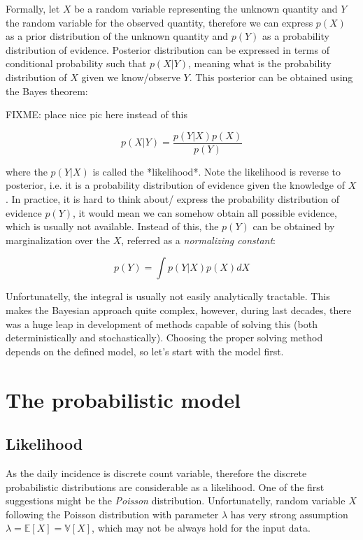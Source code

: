 \documentclass[
  digital, %
  oneside, %
  lof,     %
  lot,     %
]{fithesis4}
\begin{document}
Formally, let $X$ be a random variable representing 
the unknown quantity and $Y$ the random variable for 
the observed quantity, therefore we can express $p(X)$ 
as a prior distribution of the unknown quantity and 
$p(Y)$ as a probability distribution of evidence. 
Posterior distribution can be expressed in terms of 
conditional probability such that $p(X | Y)$, meaning 
what is the probability distribution of $X$ given we 
know/observe $Y$. 
This posterior can be obtained using the Bayes 
theorem:

FIXME: place nice pic here instead of this

\begin{equation}
p( X | Y ) = \frac{p( Y | X ) p(X)}{p(Y)}
\end{equation}

where the $p( Y | X )$ is called the *likelihood*. 
Note the likelihood is reverse to posterior, i.e. it 
is a probability distribution of evidence given the 
knowledge of $X$. 
In practice, it is hard to think about/ express the 
probability distribution of evidence $p(Y)$, it would 
mean we can somehow obtain all possible evidence, which 
is usually not available. 
Instead of this, the $p(Y)$ can be obtained by 
marginalization over the $X$, referred as a 
\textit{normalizing constant}:

\begin{equation}
p(Y) = \int p( Y | X ) p(X) dX
\end{equation}

Unfortunatelly, the integral is usually not easily 
analytically tractable. 
This makes the Bayesian approach quite complex, 
however, during last decades, there was a huge leap 
in development of methods capable of solving this 
(both deterministically and stochastically). 
Choosing the proper solving method depends on the 
defined model, so let's start with the model first.


\section{The probabilistic model}

\subsection{Likelihood}

As the daily incidence is discrete count variable, 
therefore the discrete probabilistic distributions are 
considerable as a likelihood. One of the first suggestions 
might be the \textit{Poisson} distribution. Unfortunatelly, random 
variable $X$ following the Poisson distribution with 
parameter $\lambda$ has very strong assumption 
$\lambda = \mathbb{E}\left[ X \right] = \mathbb{V}\left[ X \right]$, 
which may not be always hold for the input data. 
\end{document}
